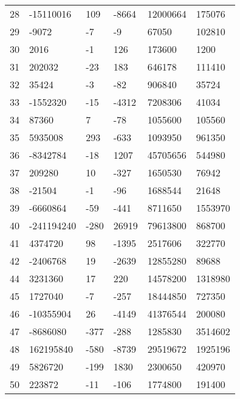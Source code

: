 \documentclass{amsart}
\begin{document}
\begin{longtable}{llllll}
28 & -15110016 & 109 & -8664 & 12000664 & 175076\\
29 & -9072 & -7 & -9 & 67050 & 102810\\
30 & 2016 & -1 & 126 & 173600 & 1200\\
31 & 202032 & -23 & 183 & 646178 & 111410\\
32 & 35424 & -3 & -82 & 906840 & 35724\\
33 & -1552320 & -15 & -4312 & 7208306 & 41034\\
34 & 87360 & 7 & -78 & 1055600 & 105560\\
35 & 5935008 & 293 & -633 & 1093950 & 961350\\
36 & -8342784 & -18 & 1207 & 45705656 & 544980\\
37 & 209280 & 10 & -327 & 1650530 & 76942\\
38 & -21504 & -1 & -96 & 1688544 & 21648\\
39 & -6660864 & -59 & -441 & 8711650 & 1553970\\
40 & -241194240 & -280 & 26919 & 79613800 & 868700\\
41 & 4374720 & 98 & -1395 & 2517606 & 322770\\
42 & -2406768 & 19 & -2639 & 12855280 & 89688\\
44 & 3231360 & 17 & 220 & 14578200 & 1318980\\
45 & 1727040 & -7 & -257 & 18444850 & 727350\\
46 & -10355904 & 26 & -4149 & 41376544 & 200080\\
47 & -8686080 & -377 & -288 & 1285830 & 3514602\\
48 & 162195840 & -580 & -8739 & 29519672 & 1925196\\
49 & 5826720 & -199 & 1830 & 2300650 & 420970\\
50 & 223872 & -11 & -106 & 1774800 & 191400\\
\hline
\end{longtable}
\end{document}

